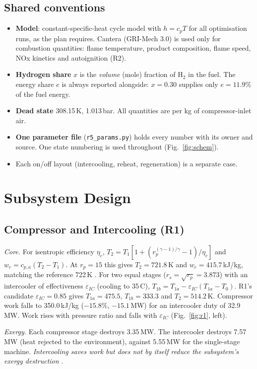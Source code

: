 \documentclass[10pt,a4paper,twocolumn]{article}
\begin{document}
\subsection{Shared conventions}
\begin{itemize}
\item \textbf{Model}: constant-specific-heat cycle model with $h=c_pT$ for all optimisation runs, as the plan requires. Cantera (GRI-Mech 3.0) is used only for combustion quantities: flame temperature, product composition, flame speed, NOx kinetics and autoignition (R2).
\item \textbf{Hydrogen share} $x$ is the \emph{volume} (mole) fraction of H$_2$ in the fuel. The energy share $e$ is always reported alongside: $x=0.30$ supplies only $e=11.9\%$ of the fuel energy.
\item \textbf{Dead state} 308.15\,K, 1.013\,bar. All quantities are per kg of compressor-inlet air.
\item \textbf{One parameter file} (\texttt{r5\_params.py}) holds every number with its owner and source. One state numbering is used throughout (Fig.~\ref{fig:schem}).
\item Each on/off layout (intercooling, reheat, regeneration) is a separate case.
\end{itemize}

\section{Subsystem Design}\label{sec:sub}
\subsection{Compressor and Intercooling (R1)}
\emph{Core.} For isentropic efficiency $\eta_c$, $T_2=T_1[1+(r_p^{(\gamma-1)/\gamma}-1)/\eta_c]$ and $w_c=c_{p,a}(T_2-T_1)$. At $r_p=15$ this gives $T_2=721.8$\,K and $w_c=415.7$\,kJ/kg, matching the reference 722\,K \cite{r1}. For two equal stages ($r_s=\sqrt{r_p}=3.873$) with an intercooler of effectiveness $\varepsilon_{IC}$ (cooling to 35\,\textdegree C), $T_{1b}=T_{1a}-\varepsilon_{IC}(T_{1a}-T_0)$. R1's candidate $\varepsilon_{IC}=0.85$ gives $T_{1a}=475.5$, $T_{1b}=333.3$ and $T_2=514.2$\,K. Compressor work falls to 350.0\,kJ/kg ($-15.8\%$, $-15.1$\,MW) for an intercooler duty of 32.9\,MW. Work rises with pressure ratio and falls with $\varepsilon_{IC}$ (Fig.~\ref{fig:r1}, left).

\emph{Exergy.} Each compressor stage destroys 3.35\,MW. The intercooler destroys 7.57\,MW (heat rejected to the environment), against 5.55\,MW for the single-stage machine. \emph{Intercooling saves work but does not by itself reduce the subsystem's exergy destruction} \cite{r1}.
\end{document}
